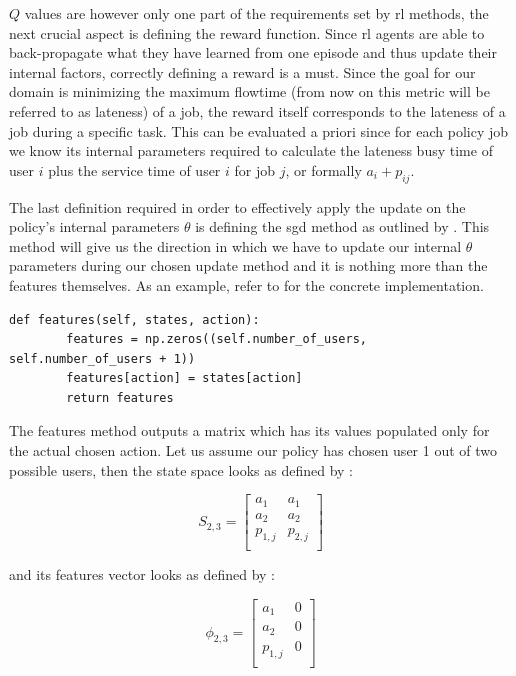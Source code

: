  $Q$ values are however only one part of the requirements set by \gls{rl} methods, the next crucial aspect is defining the reward function. Since \gls{rl} agents are able to back-propagate what they have learned from one episode and thus update their internal factors, correctly defining a reward is a must. Since the goal for our domain is minimizing the maximum flowtime (from now on this metric will be referred to as lateness) of a job, the reward itself corresponds to the lateness of a job during a specific task. This can be evaluated a priori since for each policy job we know its internal parameters required to calculate the lateness \ie busy time of user $i$ plus the service time of user $i$ for job $j$, or formally $a_i+p_{ij}$.

 The last definition required in order to effectively apply the update on the policy's internal parameters $\theta$ is defining the \gls{sgd} method as outlined by . This method will give us the direction in which we have to update our internal $\theta$ parameters during our chosen update method and it is nothing more than the features themselves. As an example, refer to  for the concrete implementation.

 \begin{lstlisting}[caption=Features definition,label=lst:features_definition,style=CustomPython]
    def features(self, states, action):
        features = np.zeros((self.number_of_users, self.number_of_users + 1))
        features[action] = states[action]
        return features
\end{lstlisting}

The features method outputs a matrix which has its values populated only for the actual chosen action. Let us assume our policy has chosen user 1 out of two possible users, then the state space looks as defined by :

\begin{equation}
\label{eq:kbatch_sp_ex}
	S_{2,3} = 
	\begin{bmatrix}
	a_1 & a_1 \\
	a_2 & a_2 \\
	p_{1,j} & p_{2,j} \\
	\end{bmatrix}
\end{equation}

and its features vector looks as defined by :

\begin{equation}
\label{eq:kbatch_features_ex}
	\phi_{2,3} = 
	\begin{bmatrix}
	a_1 & 0 \\
	a_2 & 0 \\
	p_{1,j} & 0 \\
	\end{bmatrix}
\end{equation}


